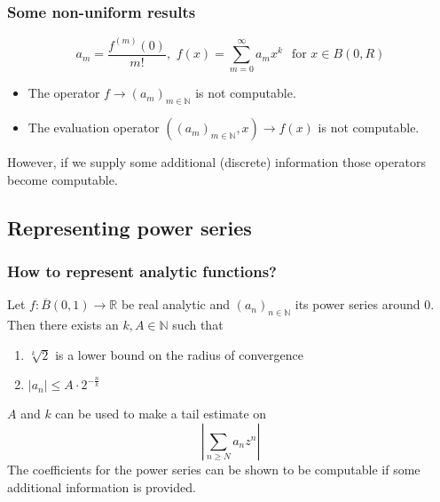 \documentclass[xcolor=pdftex,dvipsnames,table,handout]{beamer}
\newcommand{\N}{\ensuremath{\mathbb{N}}}
\newcommand{\R}{\ensuremath{\mathbb{R}}}
\newcommand{\abs}[1]{\left|#1\right|}
\begin{document}
\begin{frame}
\frametitle{Some non-uniform results}
$$a_m =\frac{f^{(m)}(0)}{m!} 
, \,\, f(x) = \sum_{m=0}^\infty a_mx^k \,\ \text{ for } x \in B(0,R)
$$
\vfill
\begin{theorem}[M\"uller (1995)]
\begin{itemize}
\item The operator $f \to (a_m)_{m \in \N}$ is not computable.
\item The evaluation operator $((a_m)_{m \in \N},x) \to f(x) $ is not computable.
\end{itemize}
\end{theorem}
\pause
However, if we supply some additional (discrete) information those operators become computable.
\end{frame}
\subsection{Representing power series}
\begin{frame}
\frametitle{How to represent analytic functions?}
\begin{lemma}
  Let $f : \overline B(0,1) \to \R$ be real analytic and $(a_n)_{n \in \N}$ its power series around $0$.\\
  Then there exists an $k,A \in \N$ such that 
  \begin{enumerate}
  \item $\sqrt[k]{2}$ is a lower bound on the radius of convergence
  \item $\abs{a_n} \leq A \cdot 2^{-\frac{n}{k}}$
  \end{enumerate}
\end{lemma}
\pause
$A$ and $k$ can be used to make a tail estimate on
$$ \left | \sum_{n \geq N} a_n z^n \right |  $$
\pause
The coefficients for the power series can be shown to be computable if some additional information is provided.
\end{frame}
\end{document}
